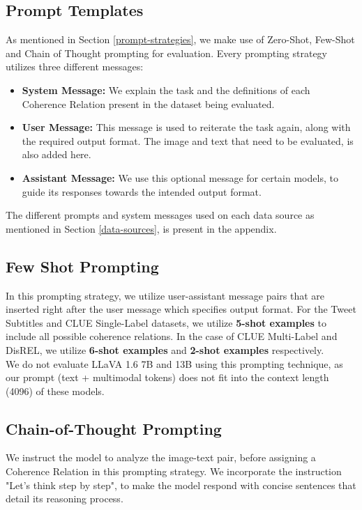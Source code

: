 \subsection{Prompt Templates} \label{appendix-eval-prompts}
As mentioned in Section \ref{prompt-strategies}, we make use of Zero-Shot, Few-Shot and Chain of Thought prompting for evaluation. Every prompting strategy utilizes three different messages:
\begin{itemize}
    \item \textbf{System Message:} We explain the task and the definitions of each Coherence Relation present in the dataset being evaluated.
    \item \textbf{User Message:} This message is used to reiterate the task again, along with the required output format. The image and text that need to be evaluated, is also added here.
    \item \textbf{Assistant Message:} We use this optional message for certain models, to guide its responses towards the intended output format.
\end{itemize}

The different prompts and system messages used on each data source as mentioned in Section \ref{data-sources}, is present in the appendix.

\subsection{Few Shot Prompting}

In this prompting strategy, we utilize user-assistant message pairs that are inserted right after the user message which specifies output format. For the Tweet Subtitles and CLUE Single-Label datasets, we utilize \textbf{5-shot examples} to include all possible coherence relations. In the case of CLUE Multi-Label and DisREL, we utilize \textbf{6-shot examples} and \textbf{2-shot examples} respectively. \\

We do not evaluate LLaVA 1.6 7B and 13B using this prompting technique, as our prompt (text + multimodal tokens) does not fit into the context length (4096) of these models. 

\subsection{Chain-of-Thought Prompting}
We instruct the model to analyze the image-text pair, before assigning a Coherence Relation in this prompting strategy. We incorporate the instruction "Let's think step by step", to make the model respond with concise sentences that detail its reasoning process.

